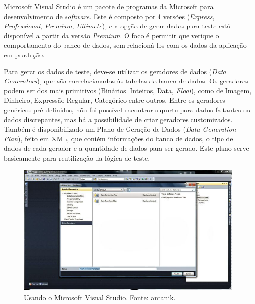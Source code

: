 \documentclass[
	12pt,				%
	openright,			%
	twoside,			%
	a4paper,			%
	english,			%
	brazil				%
	]{abntex2}
\begin{document}
		Microsoft Visual Studio \cite{VSDataGenerator} é um pacote de programas da Microsoft para desenvolvimento de \emph{software}. 
		Este é composto por 4 versões (\emph{Express}, \emph{Professional}, \emph{Premium}, \emph{Ultimate}), e a opção de gerar dados para teste está disponível a partir da versão \emph{Premium}.
		O foco é permitir que verique o comportamento do banco de dados, sem relacioná-los com os dados da aplicação em produção.
		\par
		Para gerar os dados de teste, deve-se utilizar os geradores de dados (\emph{Data Generators}), que são correlacionados às tabelas do banco de dados.
			Os geradores podem ser dos mais primitivos (Binários, Inteiros, Data, \emph{Float}), como de Imagem, Dinheiro, Expressão Regular, Categórico entre outros.
		Entre os geradores genéricos pré-definidos, não foi possível encontrar suporte para dados faltantes ou dados discrepantes, mas há a possibilidade de criar geradores customizados.
		Também é disponibilizado um Plano de Geração de Dados (\emph{Data Generation Plan}), feito em XML, que contém informações do banco de dados, o tipo de dados de cada gerador e a quantidade de dados para ser gerado. 
		Este plano serve basicamente para reutilização da lógica de teste.
		\begin{figure}[h]
			\centering
			\includegraphics[width=\linewidth]{./figures/TrabalhosRelacionados/Visual-Studio.jpg}
			\caption{Usando o Microsoft Visual Studio. Fonte: anranik.}
			\label{fig:VSDG}
		\end{figure}
\end{document}
